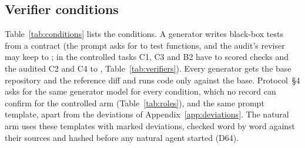 \subsection{Verifier conditions}
\label{sec:conditions}
Table~\ref{tab:conditions} lists the conditions. A generator writes black-box tests from a contract (the prompt asks for
 to  test functions, and the audit's reviser may keep
 to ; in the controlled tasks C1, C3 and B2 have
 to  scored checks and the audited C2 and C4  to
, Table~\ref{tab:verifiers}). Every generator gets
the base repository and the reference diff and runs code only against the base. Protocol~\S4 asks for the same generator
model for every condition, which no record can confirm for the controlled arm (Table~\ref{tab:roles}), and the same
prompt template, apart from the deviations of Appendix~\ref{app:deviations}. The natural arm uses these templates with
marked deviations, checked word by word against their sources and hashed before any natural agent started (D64).

